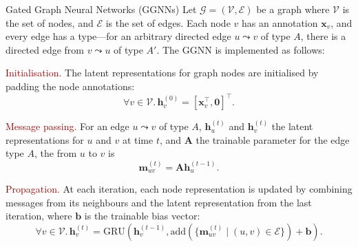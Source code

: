 \documentclass[final,hyperref={pdfpagelabels=false}]{beamer}
\begin{document}
\begin{frame}[t]
\begin{columns}[t]
\begin{column}{.3\textwidth}
      
      
    
     \vspace{-0.6in} 
    \begin{block}{Gated Graph Neural Networks (GGNNs)}
    Let $\mathcal{G}=(\mathcal{V}, \mathcal{E})$ be a graph where $\mathcal{V}$ is the set of nodes, and $\mathcal{E}$ is the set of edges. Each node $v$ has an annotation $\mathbf{x}_v$, and every edge has a type—for an arbitrary directed edge $u \leadsto v$ of type $A$, there is a directed edge from $v \leadsto u$ of type $A'$. The GGNN is implemented as follows:
    \vspace{0.2in}
    
    \textcolor{darkred}{Initialisation.} The latent representations for graph nodes are initialised by padding the node annotations:
    \begin{equation}
        \forall v \in \mathcal{V}. \, \mathbf{h}_v^{(0)} = [\mathbf{x}_v^\top, \mathbf{0}]^\top.
    \end{equation}
    
    
    \textcolor{darkred}{Message passing.} For an edge $u \leadsto v$ of type $A$, $\mathbf{h}_u^{(t)}$ and $\mathbf{h}_v^{(t)}$ the latent representations for $u$ and $v$ at time $t$, and $\mathbf{A}$ the trainable parameter for the edge type $A$, the from $u$ to $v$ is
    \begin{equation}
        \mathbf{m}_{uv}^{(t)} = \mathbf{A} \mathbf{h}_u^{(t-1)}.
    \end{equation}
    
    \textcolor{darkred}{Propagation.} At each iteration, each node representation is updated by combining messages from its neighbours and the latent representation from the last iteration, where $\mathbf{b}$ is the trainable bias vector:
    \begin{equation}\label{eq:GRU}
        \forall v \in \mathcal{V}. \, \mathbf{h}_v^{(t)} = \mathrm{GRU}\left(\mathbf{h}_v^{(t-1)}, 
        \mathrm{add}(\{\mathbf{m}_{uv}^{(t)} \mid (u, v) \in \mathcal{E} \}) + \mathbf{b}\right).
    \end{equation}


\end{block}
\end{column}
\end{columns}
\end{frame}
\end{document}
